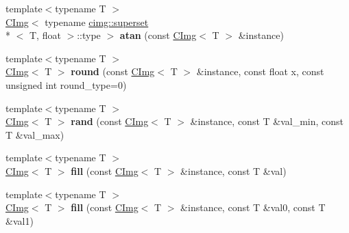 \begin{DoxyCompactItemize}
\item 
\hypertarget{namespacecimg__library_a8dc092ebc0b55c0028166ea2ff10b099}{{\footnotesize template$<$typename T $>$ }\\\hyperlink{structcimg__library_1_1_c_img}{C\-Img}$<$ typename \hyperlink{structcimg__library_1_1cimg_1_1superset}{cimg\-::superset}\\*
$<$ T, float $>$\-::type $>$ {\bfseries atan} (const \hyperlink{structcimg__library_1_1_c_img}{C\-Img}$<$ T $>$ \&instance)}\label{namespacecimg__library_a8dc092ebc0b55c0028166ea2ff10b099}

\item 
\hypertarget{namespacecimg__library_ac2d29ca52f69886a8c6d775498891afc}{{\footnotesize template$<$typename T $>$ }\\\hyperlink{structcimg__library_1_1_c_img}{C\-Img}$<$ T $>$ {\bfseries round} (const \hyperlink{structcimg__library_1_1_c_img}{C\-Img}$<$ T $>$ \&instance, const float x, const unsigned int round\-\_\-type=0)}\label{namespacecimg__library_ac2d29ca52f69886a8c6d775498891afc}

\item 
\hypertarget{namespacecimg__library_ad276f1394666e933c3cc030e48f79a95}{{\footnotesize template$<$typename T $>$ }\\\hyperlink{structcimg__library_1_1_c_img}{C\-Img}$<$ T $>$ {\bfseries rand} (const \hyperlink{structcimg__library_1_1_c_img}{C\-Img}$<$ T $>$ \&instance, const T \&val\-\_\-min, const T \&val\-\_\-max)}\label{namespacecimg__library_ad276f1394666e933c3cc030e48f79a95}

\item 
\hypertarget{namespacecimg__library_aee612a38f21aab912fa4a2a3b9e4e966}{{\footnotesize template$<$typename T $>$ }\\\hyperlink{structcimg__library_1_1_c_img}{C\-Img}$<$ T $>$ {\bfseries fill} (const \hyperlink{structcimg__library_1_1_c_img}{C\-Img}$<$ T $>$ \&instance, const T \&val)}\label{namespacecimg__library_aee612a38f21aab912fa4a2a3b9e4e966}

\item 
\hypertarget{namespacecimg__library_a0bcd796c79a6a9a96e30a8e3871933a3}{{\footnotesize template$<$typename T $>$ }\\\hyperlink{structcimg__library_1_1_c_img}{C\-Img}$<$ T $>$ {\bfseries fill} (const \hyperlink{structcimg__library_1_1_c_img}{C\-Img}$<$ T $>$ \&instance, const T \&val0, const T \&val1)}\label{namespacecimg__library_a0bcd796c79a6a9a96e30a8e3871933a3}


\end{DoxyCompactItemize}

